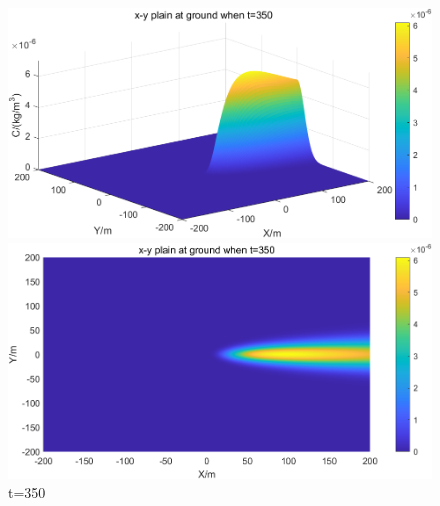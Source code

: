 \documentclass{article}
\begin{document}
	
	\begin{figure}[htbp]
		\begin{minipage}{0.49\textwidth}
			\includegraphics[width=\textwidth]{pics/default,t=350,3D.png}
		\end{minipage}
		\begin{minipage}{0.49\textwidth}
			\includegraphics[width=\textwidth]{pics/default,t=350,2D.png}
		\end{minipage}
		\caption{t=350}
		\label{fig7}
	\end{figure}
\end{document}
